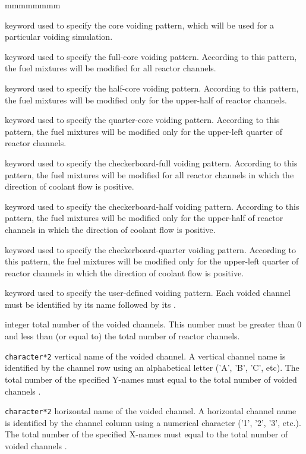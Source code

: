 \begin{ListeDeDescription}{mmmmmmmm}
\item[\moc{VOID-PATTERN}] keyword used to specify the core voiding pattern,
which will be used for a particular voiding simulation.

\item[\moc{FULL}] keyword used to specify the full-core voiding pattern.
According to this pattern, the fuel mixtures will be modified for all reactor channels.

\item[\moc{HALF}] keyword used to specify the half-core voiding pattern.
According to this pattern, the fuel mixtures will be modified only for the upper-half
of reactor channels.

\item[\moc{QUARTER}] keyword used to specify the quarter-core voiding pattern.
According to this pattern, the fuel mixtures will be modified only for the upper-left
quarter of reactor channels.

\item[\moc{CHECKER}] keyword used to specify the checkerboard-full voiding pattern.
According to this pattern, the fuel mixtures will be modified for all reactor channels in
which the direction of coolant flow is positive.

\item[\moc{CHECKER-1/2}] keyword used to specify the checkerboard-half voiding
pattern. According to this pattern, the fuel mixtures will be modified only for the upper-half
of reactor channels in which the direction of coolant flow is positive.

\item[\moc{CHECKER-1/4}] keyword used to specify the checkerboard-quarter voiding
pattern. According to this pattern, the fuel mixtures will be modified only for the upper-left
quarter of reactor channels in which the direction of coolant flow is positive.

\item[\moc{CHAN-VOID}] keyword used to specify the user-defined voiding pattern.
Each voided channel must be identified by its  name followed by its
.

\item[\dusa{nvoid}] integer total number of the voided channels. This number must be
greater than 0 and less than (or equal to) the total number of reactor channels.

\item[\dusa{YNAME}] \texttt{character*2} vertical name of the voided channel.
A vertical channel name is identified by the channel row using an alphabetical letter
('A', 'B', 'C', etc). The total number of the specified Y-names must equal to the total number
of voided channels .

\item[\dusa{XNAME}] \texttt{character*2} horizontal name of the voided channel.
A horizontal channel name is identified by the channel column using a numerical
character ('1', '2', '3', etc.). The total number of the specified X-names must equal
to the total number of voided channels .

\end{ListeDeDescription}
\clearpage
